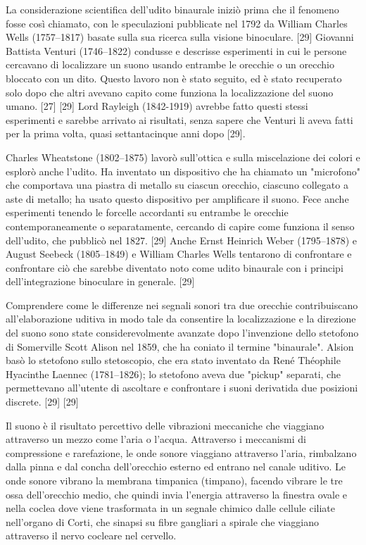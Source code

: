 La considerazione scientifica dell'udito binaurale iniziò prima che il fenomeno fosse così chiamato, con le speculazioni pubblicate nel 1792 da William Charles Wells (1757–1817) basate sulla sua ricerca sulla visione binoculare. [29] Giovanni Battista Venturi (1746–1822) condusse e descrisse esperimenti in cui le persone cercavano di localizzare un suono usando entrambe le orecchie o un orecchio bloccato con un dito. Questo lavoro non è stato seguito, ed è stato recuperato solo dopo che altri avevano capito come funziona la localizzazione del suono umano. [27] [29] Lord Rayleigh (1842-1919) avrebbe fatto questi stessi esperimenti e sarebbe arrivato ai risultati, senza sapere che Venturi li aveva fatti per la prima volta, quasi settantacinque anni dopo [29].

Charles Wheatstone (1802–1875) lavorò sull'ottica e sulla miscelazione dei colori e esplorò anche l'udito. Ha inventato un dispositivo che ha chiamato un "microfono" che comportava una piastra di metallo su ciascun orecchio, ciascuno collegato a aste di metallo; ha usato questo dispositivo per amplificare il suono. Fece anche esperimenti tenendo le forcelle accordanti su entrambe le orecchie contemporaneamente o separatamente, cercando di capire come funziona il senso dell'udito, che pubblicò nel 1827. [29] Anche Ernst Heinrich Weber (1795–1878) e August Seebeck (1805–1849) e William Charles Wells tentarono di confrontare e confrontare ciò che sarebbe diventato noto come udito binaurale con i principi dell'integrazione binoculare in generale. [29]

Comprendere come le differenze nei segnali sonori tra due orecchie contribuiscano all'elaborazione uditiva in modo tale da consentire la localizzazione e la direzione del suono sono state considerevolmente avanzate dopo l'invenzione dello stetofono di Somerville Scott Alison nel 1859, che ha coniato il termine "binaurale". Alsion basò lo stetofono sullo stetoscopio, che era stato inventato da René Théophile Hyacinthe Laennec (1781–1826); lo stetofono aveva due "pickup" separati, che permettevano all'utente di ascoltare e confrontare i suoni derivati ​​da due posizioni discrete. [29] [29]

Il suono è il risultato percettivo delle vibrazioni meccaniche che viaggiano attraverso un mezzo come l'aria o l'acqua. Attraverso i meccanismi di compressione e rarefazione, le onde sonore viaggiano attraverso l'aria, rimbalzano dalla pinna e dal concha dell'orecchio esterno ed entrano nel canale uditivo. Le onde sonore vibrano la membrana timpanica (timpano), facendo vibrare le tre ossa dell'orecchio medio, che quindi invia l'energia attraverso la finestra ovale e nella coclea dove viene trasformata in un segnale chimico dalle cellule ciliate nell'organo di Corti, che sinapsi su fibre gangliari a spirale che viaggiano attraverso il nervo cocleare nel cervello.

